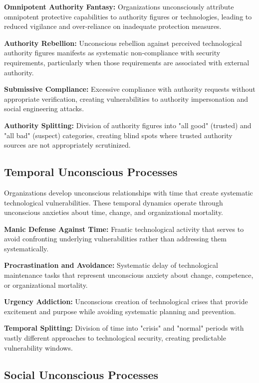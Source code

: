 \documentclass[10pt, twocolumn]{article}
\begin{document}
\textbf{Omnipotent Authority Fantasy:} Organizations unconsciously attribute omnipotent protective capabilities to authority figures or technologies, leading to reduced vigilance and over-reliance on inadequate protection measures.

\textbf{Authority Rebellion:} Unconscious rebellion against perceived technological authority figures manifests as systematic non-compliance with security requirements, particularly when those requirements are associated with external authority.

\textbf{Submissive Compliance:} Excessive compliance with authority requests without appropriate verification, creating vulnerabilities to authority impersonation and social engineering attacks.

\textbf{Authority Splitting:} Division of authority figures into "all good" (trusted) and "all bad" (suspect) categories, creating blind spots where trusted authority sources are not appropriately scrutinized.

\subsection{Temporal Unconscious Processes}

Organizations develop unconscious relationships with time that create systematic technological vulnerabilities. These temporal dynamics operate through unconscious anxieties about time, change, and organizational mortality.

\textbf{Manic Defense Against Time:} Frantic technological activity that serves to avoid confronting underlying vulnerabilities rather than addressing them systematically.

\textbf{Procrastination and Avoidance:} Systematic delay of technological maintenance tasks that represent unconscious anxiety about change, competence, or organizational mortality.

\textbf{Urgency Addiction:} Unconscious creation of technological crises that provide excitement and purpose while avoiding systematic planning and prevention.

\textbf{Temporal Splitting:} Division of time into "crisis" and "normal" periods with vastly different approaches to technological security, creating predictable vulnerability windows.

\subsection{Social Unconscious Processes}
\end{document}
